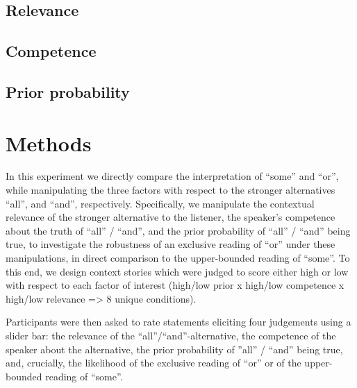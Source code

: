 \documentclass{sp}
\begin{document}
\subsection{Relevance}

\subsection{Competence}

\subsection{Prior probability}

\section{Methods}

In this experiment we directly compare the interpretation of “some” and “or”, while manipulating the three factors with respect to the stronger alternatives “all”, and “and”, respectively. Specifically, we manipulate the contextual relevance of the stronger alternative to the listener, the speaker's competence about the truth of “all” / “and”, and the prior probability of “all” / “and” being true, to investigate the robustness of an exclusive reading of “or” under these manipulations, in direct comparison to the upper-bounded reading of “some”.
To this end, we design context stories which were judged to score either high or low with respect to each factor of interest (high/low prior x high/low competence x high/low relevance => 8 unique conditions). 

Participants were then asked to rate statements eliciting four judgements using a slider bar: the relevance of the “all”/“and”-alternative, the competence of the speaker about the alternative, the prior probability of ”all” / “and” being true, and, crucially, the likelihood of the exclusive reading of “or” or of the upper-bounded reading of “some”.
\end{document}
